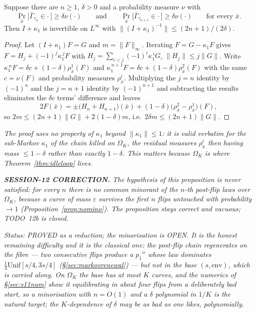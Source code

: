 \begin{proposition}\label{prop:c1}
Suppose there are $n\ge1$, $\delta>0$ and a probability measure $\nu$
with
\[
\Pr_{\bar x}\bigl[\bar\Gamma_{\tau_n}\in\cdot\,\bigr]\ge\delta\nu(\cdot)
\qquad\text{and}\qquad
\Pr_{\bar x}\bigl[\bar\Gamma_{\tau_{n+1}}\in\cdot\,\bigr]\ge\delta\nu(\cdot)
\qquad\text{for every }\bar x .
\]
Then $I+\kappa_1$ is invertible on $L^\infty$ with
$\|(I+\kappa_1)^{-1}\|\le(2n+1)/(2\delta)$.
\end{proposition}

\begin{proof}
Let $(I+\kappa_1)F=G$ and $m=\|F\|_\infty$.  Iterating
$F=G-\kappa_1F$ gives $F=H_j+(-1)^j\kappa_1^{\,j}F$ with
$H_j=\sum_{i<j}(-1)^i\kappa_1^{\,i}G$, $\|H_j\|\le j\|G\|$.  Write
$\kappa_1^{\,n}F=\delta c+(1-\delta)\rho^1_{\bar x}(F)$ and
$\kappa_1^{\,n+1}F=\delta c+(1-\delta)\rho^2_{\bar x}(F)$ with the same
$c=\nu(F)$ and probability measures $\rho^i_{\bar x}$.  Multiplying the
$j=n$ identity by $(-1)^n$ and the $j=n+1$ identity by $(-1)^{n+1}$ and
subtracting the results eliminates the $\delta c$ terms' difference and
leaves
\[
2F(\bar x)=\pm\bigl(H_n+H_{n+1}\bigr)(\bar x)
+(1-\delta)\bigl(\rho^2_{\bar x}-\rho^1_{\bar x}\bigr)(F),
\]
so $2m\le(2n+1)\|G\|+2(1-\delta)m$, i.e.\
$2\delta m\le(2n+1)\|G\|$.
\end{proof}

\emph{The proof uses no property of $\kappa_1$ beyond
$\|\kappa_1\|\le1$: it is valid verbatim for the \emph{sub}-Markov
$\kappa_1$ of the chain killed on $\Omega_K$, the residual measures
$\rho^i_{\bar x}$ then having mass $\le1-\delta$ rather than exactly
$1-\delta$.  This matters because $\Omega_K$ is where
Theorem~\ref{thm:idleloop} lives.}

\emph{\textbf{SESSION-12 CORRECTION.}  The hypothesis of this proposition
is never satisfied: for every $n$ there is no common minorant of the
$n$-th post-flip laws over $\Omega_K$, because a curve of mass
$\varepsilon$ survives the first $n$ flips untouched with probability
$\to1$ (Proposition~\ref{prop:nomino}).  The proposition stays correct
and vacuous; TODO~12b is closed.}

\emph{Status: PROVED as a reduction; the minorisation is OPEN.  It is
the honest remaining difficulty and it is the classical one: the
post-flip chain regenerates on the fibre --- two consecutive flips
produce a $p_1''$ whose law dominates
$\tfrac14\mathrm{Unif}[s/4,3s/4]$ (\S\ref{sec:markovrenewal}) --- but
not in the base $(s,\mathrm{env})$, which is carried along.  On
$\Omega_K$ the base has at most $K$ curves, and the numerics of
\S\ref{sec:s11num} show it equilibrating in about four flips from a
deliberately bad start, so a minorisation with $n=O(1)$ and a
$\delta$ polynomial in $1/K$ is the natural target; the $K$-dependence
of $\delta$ may be as bad as one likes, polynomially.}

